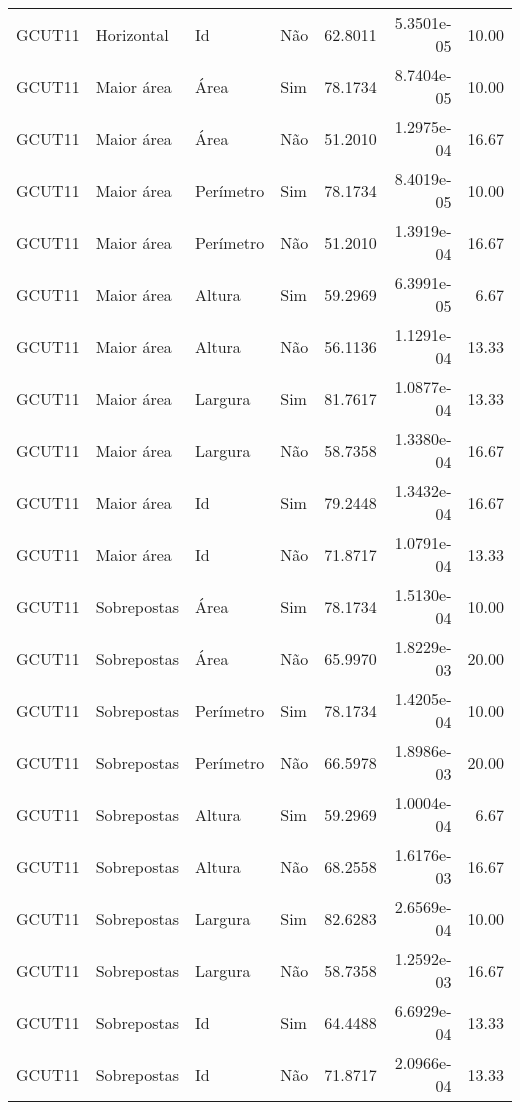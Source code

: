 \begin{tabular}{llllrrr}
GCUT11    & Horizontal  & Id        & Não         & 62.8011      & 5.3501e-05 & 10.00    \\
GCUT11    & Maior área  & Área      & Sim         & 78.1734      & 8.7404e-05 & 10.00    \\
GCUT11    & Maior área  & Área      & Não         & 51.2010      & 1.2975e-04 & 16.67    \\
GCUT11    & Maior área  & Perímetro & Sim         & 78.1734      & 8.4019e-05 & 10.00    \\
GCUT11    & Maior área  & Perímetro & Não         & 51.2010      & 1.3919e-04 & 16.67    \\
GCUT11    & Maior área  & Altura    & Sim         & 59.2969      & 6.3991e-05 & 6.67     \\
GCUT11    & Maior área  & Altura    & Não         & 56.1136      & 1.1291e-04 & 13.33    \\
GCUT11    & Maior área  & Largura   & Sim         & 81.7617      & 1.0877e-04 & 13.33    \\
GCUT11    & Maior área  & Largura   & Não         & 58.7358      & 1.3380e-04 & 16.67    \\
GCUT11    & Maior área  & Id        & Sim         & 79.2448      & 1.3432e-04 & 16.67    \\
GCUT11    & Maior área  & Id        & Não         & 71.8717      & 1.0791e-04 & 13.33    \\
GCUT11    & Sobrepostas & Área      & Sim         & 78.1734      & 1.5130e-04 & 10.00    \\
GCUT11    & Sobrepostas & Área      & Não         & 65.9970      & 1.8229e-03 & 20.00    \\
GCUT11    & Sobrepostas & Perímetro & Sim         & 78.1734      & 1.4205e-04 & 10.00    \\
GCUT11    & Sobrepostas & Perímetro & Não         & 66.5978      & 1.8986e-03 & 20.00    \\
GCUT11    & Sobrepostas & Altura    & Sim         & 59.2969      & 1.0004e-04 & 6.67     \\
GCUT11    & Sobrepostas & Altura    & Não         & 68.2558      & 1.6176e-03 & 16.67    \\
GCUT11    & Sobrepostas & Largura   & Sim         & 82.6283      & 2.6569e-04 & 10.00    \\
GCUT11    & Sobrepostas & Largura   & Não         & 58.7358      & 1.2592e-03 & 16.67    \\
GCUT11    & Sobrepostas & Id        & Sim         & 64.4488      & 6.6929e-04 & 13.33    \\
GCUT11    & Sobrepostas & Id        & Não         & 71.8717      & 2.0966e-04 & 13.33    \\
\hline
\end{tabular}